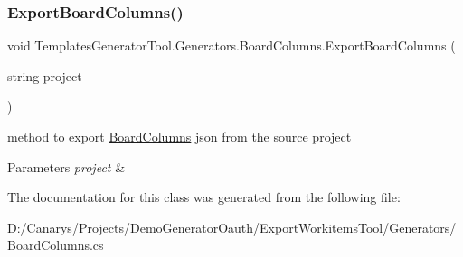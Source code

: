 \subsubsection{\texorpdfstring{Export\+Board\+Columns()}{ExportBoardColumns()}}
{\footnotesize\ttfamily void Templates\+Generator\+Tool.\+Generators.\+Board\+Columns.\+Export\+Board\+Columns (\begin{DoxyParamCaption}\item[{string}]{project }\end{DoxyParamCaption})}



method to export \mbox{\hyperlink{class_templates_generator_tool_1_1_generators_1_1_board_columns}{Board\+Columns}} json from the source project 


\begin{DoxyParams}{Parameters}
{\em project} & \\
\hline
\end{DoxyParams}


The documentation for this class was generated from the following file\+:\begin{DoxyCompactItemize}
\item 
D\+:/\+Canarys/\+Projects/\+Demo\+Generator\+Oauth/\+Export\+Workitems\+Tool/\+Generators/Board\+Columns.\+cs\end{DoxyCompactItemize}
